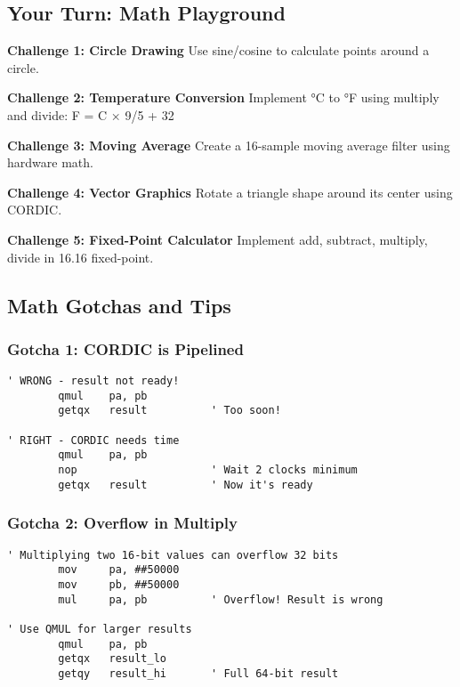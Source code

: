 \documentclass[11pt]{book}
\begin{document}
\hypertarget{your-turn-math-playground}{%
\subsection{Your Turn: Math
Playground}\label{your-turn-math-playground}}

\begin{yourturn}
\textbf{Challenge 1: Circle Drawing}
Use sine/cosine to calculate points around a circle.

\textbf{Challenge 2: Temperature Conversion}
Implement °C to °F using multiply and divide: F = C × 9/5 + 32

\textbf{Challenge 3: Moving Average}
Create a 16-sample moving average filter using hardware math.

\textbf{Challenge 4: Vector Graphics}
Rotate a triangle shape around its center using CORDIC.

\textbf{Challenge 5: Fixed-Point Calculator}
Implement add, subtract, multiply, divide in 16.16 fixed-point.
\end{yourturn}

\hypertarget{math-gotchas-and-tips}{%
\subsection{Math Gotchas and Tips}\label{math-gotchas-and-tips}}

\hypertarget{gotcha-1-cordic-is-pipelined}{%
\subsubsection{Gotcha 1: CORDIC is
Pipelined}\label{gotcha-1-cordic-is-pipelined}}

\begin{lstlisting}
' WRONG - result not ready!
        qmul    pa, pb
        getqx   result          ' Too soon!
        
' RIGHT - CORDIC needs time
        qmul    pa, pb
        nop                     ' Wait 2 clocks minimum
        getqx   result          ' Now it's ready
\end{lstlisting}

\hypertarget{gotcha-2-overflow-in-multiply}{%
\subsubsection{Gotcha 2: Overflow in
Multiply}\label{gotcha-2-overflow-in-multiply}}

\begin{lstlisting}
' Multiplying two 16-bit values can overflow 32 bits
        mov     pa, ##50000
        mov     pb, ##50000
        mul     pa, pb          ' Overflow! Result is wrong
        
' Use QMUL for larger results
        qmul    pa, pb
        getqx   result_lo
        getqy   result_hi       ' Full 64-bit result
\end{lstlisting}
\end{document}
